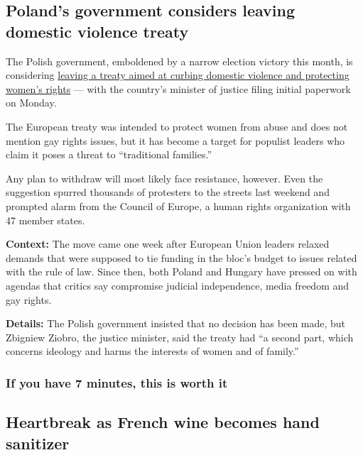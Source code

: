\hypertarget{polands-government-considers-leaving-domestic-violence-treaty}{%
\subsection{Poland's government considers leaving domestic violence
treaty}\label{polands-government-considers-leaving-domestic-violence-treaty}}

The Polish government, emboldened by a narrow election victory this
month, is considering
\href{https://www.nytimes.com/2020/07/27/world/europe/poland-domestic-violence-treaty.html}{leaving
a treaty aimed at curbing domestic violence and protecting women's
rights} --- with the country's minister of justice filing initial
paperwork on Monday.

The European treaty was intended to protect women from abuse and does
not mention gay rights issues, but it has become a target for populist
leaders who claim it poses a threat to ``traditional families.''

Any plan to withdraw will most likely face resistance, however. Even the
suggestion spurred thousands of protesters to the streets last weekend
and prompted alarm from the Council of Europe, a human rights
organization with 47 member states.

\textbf{Context:} The move came one week after European Union leaders
relaxed demands that were supposed to tie funding in the bloc's budget
to issues related with the rule of law. Since then, both Poland and
Hungary have pressed on with agendas that critics say compromise
judicial independence, media freedom and gay rights.

\textbf{Details:} The Polish government insisted that no decision has
been made, but Zbigniew Ziobro, the justice minister, said the treaty
had ``a second part, which concerns ideology and harms the interests of
women and of family.''

\hypertarget{if-you-have-7-minutes-this-is-worth-it}{%
\subsubsection{If you have 7 minutes, this is worth
it}\label{if-you-have-7-minutes-this-is-worth-it}}

\hypertarget{heartbreak-as-french-wine-becomes-hand-sanitizer}{%
\subsection{Heartbreak as French wine becomes hand
sanitizer}\label{heartbreak-as-french-wine-becomes-hand-sanitizer}}

